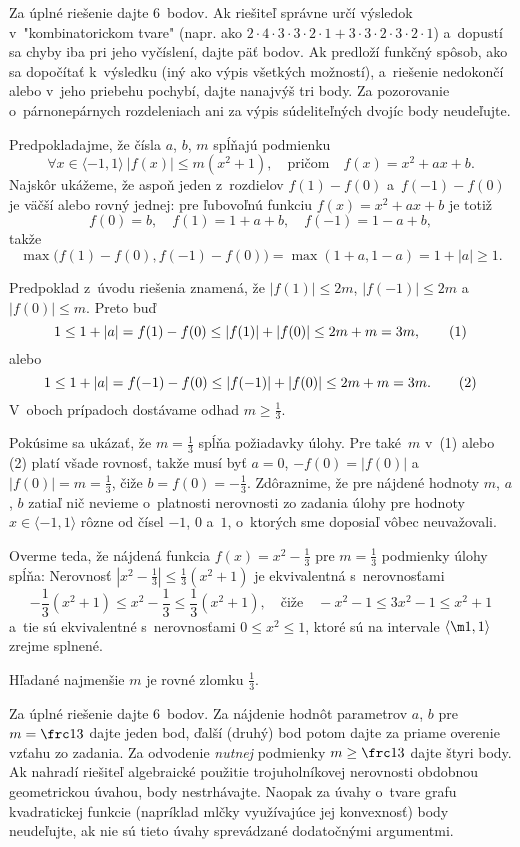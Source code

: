 {\nobreak\medskip\petit\noindent
Za úplné riešenie dajte 6~bodov.
Ak riešiteľ správne určí výsledok v~"kombinatorickom
tvare" (napr. ako $2 \cdot 4 \cdot 3 \cdot 3 \cdot 2 \cdot 1 + 3
\cdot 3 \cdot 2 \cdot 3 \cdot 2 \cdot 1$) a~dopustí sa chyby iba pri
jeho vyčíslení, dajte päť bodov. Ak predloží funkčný
spôsob, ako sa dopočítať k~výsledku (iný ako výpis všetkých
možností), a~riešenie nedokončí alebo v~jeho priebehu pochybí,
dajte nanajvýš tri body. Za pozorovanie o~párnonepárnych
rozdeleniach ani za výpis súdeliteľných dvojíc body neudeľujte.

\endpetit
\bigbreak
}

{%
Predpokladajme, že čísla $a$, $b$, $m$ spĺňajú podmienku
$$
\forall x\in\langle -1,1\rangle\: |f(x)|\le
m(x^2+1),\quad\text{pričom}\quad f(x)=x^2+ax+b.
$$
Najskôr ukážeme,
že aspoň jeden z~rozdielov $f(1) - f(0)$ a~$f(-1) - f(0)$ je
väčší alebo rovný jednej:
pre ľubovoľnú funkciu $f(x) = x^2 + ax+ b$ je totiž
$$
f(0)=b,\quad f(1)=1+a+b, \quad f(-1)=1-a+b,
$$
takže
$$
\max\bigl( f(1)-f(0), f(-1)-f(0)\big)= \max(1+a,1-a)=1+|a|\ge1.
$$

Predpoklad z~úvodu riešenia znamená, že $|f(1)| \le 2m$, $|f({-1})| \le 2m$ a~$|f(0)| \le m$.
Preto buď
$$
1 \le 1+|a|= f(1) - f(0) \le |f(1)| + |f(0)| \le 2m + m = 3m, \tag1
$$
alebo
$$
1 \le 1+|a|= f(-1) - f(0) \le |f(-1)| + |f(0)| \le 2m + m = 3m. \tag2
$$
V~oboch prípadoch dostávame odhad $m \ge \frac13$.

Pokúsime sa ukázať, že $m=\frac13$ spĺňa požiadavky úlohy. Pre také~$m$
v~(1) alebo (2) platí všade rovnosť, takže musí byť $a=0$, ${-f(0)}=|f(0)|$ a~$|f(0)|=m=\frac13$, čiže
$b=f(0)={-\frac13}$.
Zdôraznime, že pre nájdené hodnoty $m$, $a$, $b$
zatiaľ nič nevieme o~platnosti nerovnosti zo zadania úlohy
pre hodnoty $x\in\langle{-1}, 1\rangle$ rôzne od čísel ${-1}$, $0$ a~$1$,
o~ktorých sme doposiaľ vôbec neuvažovali.

Overme teda,
že nájdená funkcia $f(x) = x^2 - \frac13$ pre $m = \frac13$
podmienky úlohy spĺňa: Nerovnosť $|x^2-\frac13|\le\frac13(x^2+1)$ je
ekvivalentná s~nerovnosťami
$$
-\frac13(x^2+1)\le x^2-\frac13\le\frac13(x^2+1),\quad\text{čiže}\quad
-x^2-1\le3x^2-1\le x^2+1
$$
a~tie sú ekvivalentné s~nerovnosťami
$0\le x^2 \le 1$, ktoré sú
na intervale $\langle \m1, 1 \rangle$ zrejme splnené.

\odpoved
Hľadané najmenšie $m$ je rovné zlomku $\frac13$.


\nobreak\medskip\petit\noindent
Za úplné riešenie dajte 6~bodov.
Za nájdenie hodnôt parametrov $a$, $b$ pre
$m = \frc13$ dajte jeden bod, ďalší (druhý) bod potom dajte za priame overenie
vzťahu zo zadania. Za odvodenie {\it nutnej\/} podmienky $m \ge \frc13$ dajte štyri body.
Ak nahradí riešiteľ algebraické použitie trojuholníkovej nerovnosti
obdobnou geometrickou úvahou, body nestrhávajte. Naopak za úvahy
o~tvare grafu kvadratickej funkcie (napríklad mlčky využívajúce
jej konvexnosť) body neudeľujte, ak nie sú tieto úvahy sprevádzané
dodatočnými argumentmi.
\endpetit
\bigbreak}

